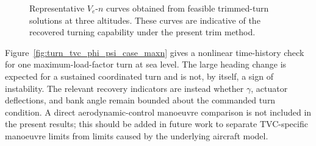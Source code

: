 \documentclass[conf]{new-aiaa}
\begin{document}
\begin{figure}[!h]
\centering
{}
\caption{Representative $V_e$-$n$ curves obtained from feasible trimmed-turn solutions at three altitudes. These curves are indicative of the recovered turning capability under the present trim method.}
\label{fig:tvc_vn_smoothed}
\end{figure}

Figure~\ref{fig:turn_tvc_phi_psi_case_maxn} gives a nonlinear time-history check for one maximum-load-factor turn at sea level. The large heading change is expected for a sustained coordinated turn and is not, by itself, a sign of instability. The relevant recovery indicators are instead whether $\gamma$, actuator deflections, and bank angle remain bounded about the commanded turn condition. A direct aerodynamic-control manoeuvre comparison is not included in the present results; this should be added in future work to separate TVC-specific manoeuvre limits from limits caused by the underlying aircraft model.
\end{document}
